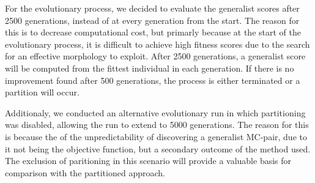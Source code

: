         For the evolutionary process, we decided to evaluate the generalist scores after 2500 generations, instead of at every generation from the start. The reason for this is to decrease computational cost, but primarly because at the start of the evolutionary process, it is difficult to achieve high fitness scores due to the search for an effective morphology to exploit. After 2500 generations, a generalist score will be computed from the fittest individual in each generation. If there is no improvement found after 500 generations, the process is either terminated or a partition will occur.

        Additionaly, we conducted an alternative evolutionary run in which partitioning was disabled, allowing the run to extend to 5000 generations. The reason for this is because the of the unpredictability of discovering a generalist MC-pair, due to it not being the objective function, but a secondary outcome of the method used. The exclusion of paritioning in this scenario will provide a valuable basis for comparison with the partitioned approach.
